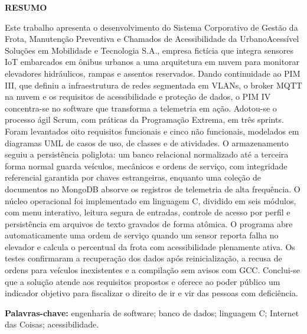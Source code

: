 \documentclass[12pt,a4paper,oneside]{report}
\newcommand{\titulocentral}[1]{%
  \begin{center}\textbf{\MakeUppercase{#1}}\end{center}\vspace{0.8\baselineskip}}
\begin{document}
\thispagestyle{empty}
\titulocentral{Resumo}
\noindent
Este trabalho apresenta o desenvolvimento do Sistema Corporativo de Gestão da Frota, Manutenção
Preventiva e Chamados de Acessibilidade da UrbanoAcessível Soluções em Mobilidade e Tecnologia S.A.,
empresa fictícia que integra sensores IoT embarcados em ônibus urbanos a uma arquitetura em nuvem
para monitorar elevadores hidráulicos, rampas e assentos reservados. Dando continuidade ao PIM III,
que definiu a infraestrutura de redes segmentada em VLANs, o broker MQTT na nuvem e os requisitos de
acessibilidade e proteção de dados, o PIM IV concentra-se no software que transforma a telemetria em
ação. Adotou-se o processo ágil Scrum, com práticas da Programação Extrema, em três sprints. Foram
levantados oito requisitos funcionais e cinco não funcionais, modelados em diagramas UML de casos de
uso, de classes e de atividades. O armazenamento seguiu a persistência poliglota: um banco relacional
normalizado até a terceira forma normal guarda veículos, mecânicos e ordens de serviço, com integridade
referencial garantida por chaves estrangeiras, enquanto uma coleção de documentos no MongoDB absorve os
registros de telemetria de alta frequência. O núcleo operacional foi implementado em linguagem C,
dividido em seis módulos, com menu interativo, leitura segura de entradas, controle de acesso por perfil
e persistência em arquivos de texto gravados de forma atômica. O programa abre automaticamente uma ordem
de serviço quando um sensor reporta falha no elevador e calcula o percentual da frota com
acessibilidade plenamente ativa. Os testes confirmaram a recuperação dos dados após reinicialização, a
recusa de ordens para veículos inexistentes e a compilação sem avisos com GCC. Conclui-se que a solução
atende aos requisitos propostos e oferece ao poder público um indicador objetivo para fiscalizar o
direito de ir e vir das pessoas com deficiência.

\vspace{\baselineskip}
\noindent\textbf{Palavras-chave:} engenharia de software; banco de dados; linguagem C; Internet das
Coisas; acessibilidade.
\clearpage
\end{document}

